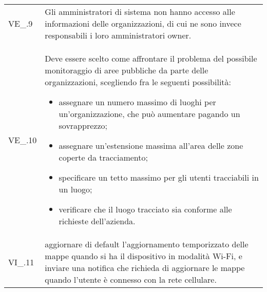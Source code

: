 {\begin{longtable}{ >{\centering}p{} >{}p{}}
	VE\_\Data.9 & Gli amministratori di sistema non hanno accesso alle informazioni delle organizzazioni\ap{G}, di cui ne sono invece responsabili i loro amministratori owner. \\
	VE\_\Data.10 & Deve essere scelto come affrontare il problema del possibile monitoraggio di aree pubbliche da parte delle organizzazioni\ap{G}, scegliendo fra le seguenti possibilità:
	\begin{itemize}
		\item assegnare un numero massimo di luoghi per un'organizzazione\ap{G}, che può aumentare pagando un sovrapprezzo;
		\item assegnare un'estensione massima all'area delle zone coperte da tracciamento;
		\item specificare un tetto massimo per gli utenti tracciabili in un luogo;
		\item verificare che il luogo tracciato sia conforme alle richieste dell'azienda.
	\end{itemize} \mbox{} \\
	VI\_\Data.11 & aggiornare di default l’aggiornamento temporizzato delle mappe quando si ha il dispositivo in modalità Wi-Fi, e inviare una notifica che richieda di aggiornare le mappe quando l’utente è connesso con la rete cellulare. \\
\end{longtable}
}

